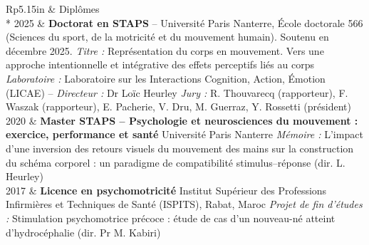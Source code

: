 \documentclass[a4paper, 11pt]{article}
\newcommand{\headingfont}{\Large\color{PineGreen}}
\newenvironment{SectionTable}[1]{
	\renewcommand*{\arraystretch}{1.1}
	\setlength{\tabcolsep}{8pt}
	\begin{longtable}{Rp{5.15in}} & #1 \\*}
{\end{longtable}\vspace{2pt}}
\begin{document}
\begin{SectionTable}{\headingfont Diplômes}
	2025 &
	\textbf{Doctorat en STAPS} -- Université Paris Nanterre, École doctorale 566 (Sciences du sport, de la motricité et du mouvement humain). Soutenu en décembre 2025.\newline
	\textit{Titre :} Représentation du corps en mouvement. Vers une approche intentionnelle et intégrative des effets perceptifs liés au corps\newline
	\textit{Laboratoire :} Laboratoire sur les Interactions Cognition, Action, Émotion (LICAE) -- \textit{Directeur :} Dr Loïc Heurley\newline
	\textit{Jury :} R. Thouvarecq (rapporteur), F. Waszak (rapporteur), E. Pacherie, V. Dru, M. Guerraz, Y. Rossetti (président) \\

	2020 &
	\textbf{Master STAPS -- Psychologie et neurosciences du mouvement : exercice, performance et santé}\newline
	Université Paris Nanterre\newline
	\textit{Mémoire :} L'impact d'une inversion des retours visuels du mouvement des mains sur la construction du schéma corporel : un paradigme de compatibilité stimulus--réponse (dir. L. Heurley) \\

	2017 &
	\textbf{Licence en psychomotricité}\newline
	Institut Supérieur des Professions Infirmières et Techniques de Santé (ISPITS), Rabat, Maroc\newline
	\textit{Projet de fin d'études :} Stimulation psychomotrice précoce : étude de cas d'un nouveau-né atteint d'hydrocéphalie (dir. Pr M. Kabiri) \\
\end{SectionTable}
\end{document}
